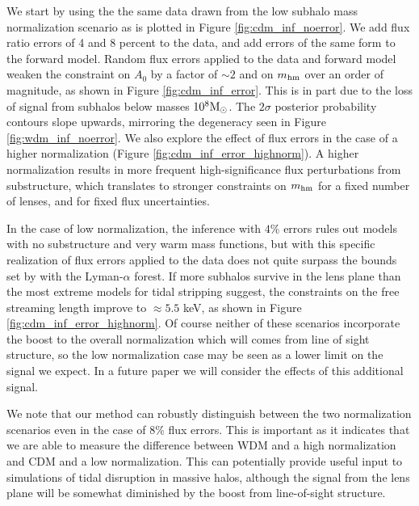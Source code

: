 We start by using the the same data drawn from the low subhalo mass normalization scenario as is plotted in Figure \ref{fig:cdm_inf_noerror}. We add flux ratio errors of 4 and 8 percent to the data, and add errors of the same form to the forward model. Random flux errors applied to the data and forward model weaken the constraint on $A_0$  by a factor of $\sim2$ and on $ m_{\rm{hm}}$ over an order of magnitude, as shown in Figure \ref{fig:cdm_inf_error}. This is in part due to the loss of signal from subhalos below masses $10^8 {\rm{M}_{\odot}}$. The $2\sigma$ posterior probability contours slope upwards, mirroring the degeneracy seen in Figure \ref{fig:wdm_inf_noerror}. We also explore the effect of flux errors in the case of a higher normalization (Figure \ref{fig:cdm_inf_error_highnorm}). A higher normalization results in more frequent high-significance flux perturbations from substructure, which translates to stronger constraints on $m_{\rm{hm}}$ for a fixed number of lenses, and for fixed flux uncertainties.

In the case of low normalization, the inference with $4\%$ errors rules out models with no substructure and very warm mass functions, but with this specific realization of flux errors applied to the data does not quite surpass the bounds set by \cite{Viel13} with the Lyman-$\alpha$ forest. If more subhalos survive in the lens plane than the most extreme models for tidal stripping suggest, the constraints on the free streaming length improve to $\approx 5.5$ keV, as shown in Figure \ref{fig:cdm_inf_error_highnorm}. Of course neither of these scenarios incorporate the boost to the overall normalization which will comes from line of sight structure, so the low normalization case may be seen as a lower limit on the signal we expect. In a future paper we will consider the effects of this additional signal.

We note that our method can robustly distinguish between the two normalization scenarios even in the case of 8\% flux errors. This is important as it indicates that we are able to measure the difference between WDM and a high normalization and CDM and a low normalization. This can potentially provide useful input to simulations of tidal disruption in massive halos, although the signal from the lens plane will be somewhat diminished by the boost from line-of-sight structure.

